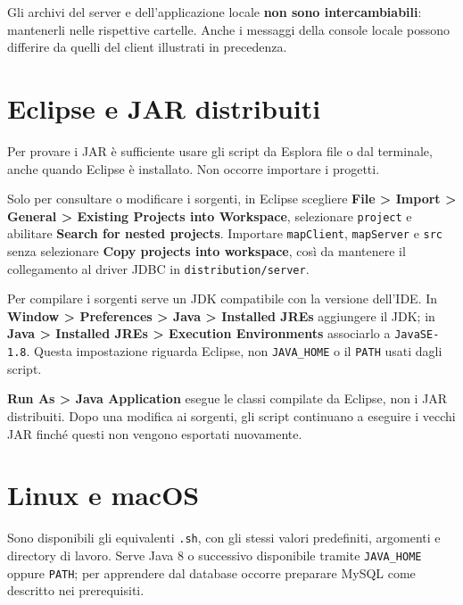 \documentclass[11pt,a4paper]{article}
\begin{document}
Gli archivi del server e dell'applicazione locale \textbf{non sono
intercambiabili}: mantenerli nelle rispettive cartelle. Anche i messaggi della
console locale possono differire da quelli del client illustrati in precedenza.

\section*{Eclipse e JAR distribuiti}

Per provare i JAR è sufficiente usare gli script da Esplora file o dal terminale,
anche quando Eclipse è installato. Non occorre importare i progetti.

Solo per consultare o modificare i sorgenti, in Eclipse scegliere
\textbf{File > Import > General > Existing Projects into Workspace}, selezionare
\texttt{project} e abilitare \textbf{Search for nested projects}. Importare
\texttt{mapClient}, \texttt{mapServer} e \texttt{src} senza selezionare
\textbf{Copy projects into workspace}, così da mantenere il collegamento al
driver JDBC in \texttt{distribution/server}.

Per compilare i sorgenti serve un JDK compatibile con la versione dell'IDE.
In \textbf{Window > Preferences > Java > Installed JREs} aggiungere il JDK;
in \textbf{Java > Installed JREs > Execution Environments} associarlo a
\texttt{JavaSE-1.8}. Questa impostazione riguarda Eclipse, non
\texttt{JAVA\_HOME} o il \texttt{PATH} usati dagli script.

\textbf{Run As > Java Application} esegue le classi compilate da Eclipse,
non i JAR distribuiti. Dopo una modifica ai sorgenti, gli script continuano a
eseguire i vecchi JAR finché questi non vengono esportati nuovamente.

\clearpage
\section*{Linux e macOS}

Sono disponibili gli equivalenti \texttt{.sh}, con gli stessi valori predefiniti,
argomenti e directory di lavoro. Serve Java 8 o successivo disponibile tramite
\texttt{JAVA\_HOME} oppure \texttt{PATH}; per apprendere dal database occorre
preparare MySQL come descritto nei prerequisiti.
\end{document}
